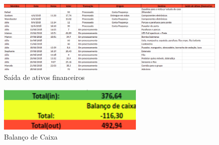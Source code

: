 \begin{figure}[!htb]
	\centering
	\includegraphics[width=17cm]{figuras/saida_ativos_junho.png}
	\caption{Saída de ativos financeiros} \label{saida_ativos_junho}
\end{figure}

\begin{figure}[!htb]
	\centering
	\includegraphics[width=7cm]{figuras/balanco_junho.png}
	\caption{Balanço de Caixa} \label{balanco_junho}
\end{figure}